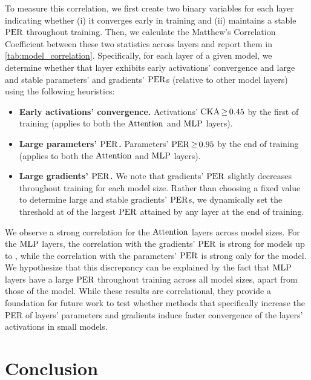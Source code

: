 To measure this correlation, we first create two binary variables for each layer indicating whether (i) it converges early in training and (ii) maintains a stable $\mathrm{PER}$ throughout training. Then, we calculate the Matthew's Correlation Coefficient between these two statistics across layers and report them in \cref{tab:model_correlation}.
Specifically, for each layer of a given model, we determine whether that layer exhibits early activations' convergence and large and stable parameters' and gradients' $\mathrm{PER}$s (relative to other model layers) using the following heuristics: 
\begin{itemize}
    \item \textbf{Early activations' convergence.} Activations' $\cka \mathop{\geq} \float[2]{0.45}$ by the first  of training (applies to both the $\mathrm{Attention}$ and $\mathrm{MLP}$ layers).
    
    \item \textbf{Large parameters' $\mathrm{PER}$.} Parameters' $\per \mathop{\geq} \float[2]{0.95}$ by the end of training (applies to both the $\mathrm{Attention}$ and $\mathrm{MLP}$ layers).
    
    \item \textbf{Large gradients' $\mathrm{PER}$.} We note that gradients' $\mathrm{PER}$ slightly decreases throughout training for each model size. Rather than choosing a fixed value to determine large and stable gradients' $\mathrm{PER}$s, we dynamically set the threshold at  of the largest $\mathrm{PER}$ attained by any layer at the end of training.
\end{itemize}
We observe a strong correlation for the $\mathrm{Attention}$ layers across model sizes. For the $\mathrm{MLP}$ layers, the correlation with the gradients' $\mathrm{PER}$ is strong for models up to \onebil, while the correlation with the parameters' $\mathrm{PER}$ is strong only for the \sevenmil model. We hypothesize that this discrepancy can be explained by the fact that $\mathrm{MLP}$ layers have a large $\mathrm{PER}$ throughout training across all model sizes, apart from those of the \sevenmil model. While these results are correlational, they provide a foundation for future work to test whether methods that specifically increase the PER of layers' parameters and gradients induce faster convergence of the layers' activations in small models.



\section{Conclusion}

